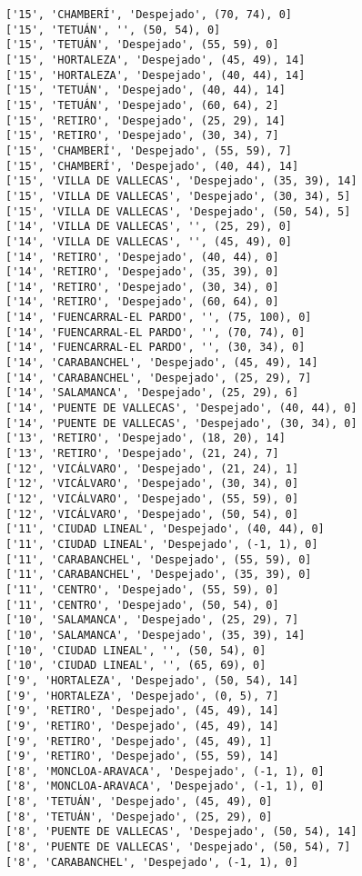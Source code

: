 \documentclass[11pt]{article}
\begin{document}
\begin{Verbatim}[commandchars=\\\{\}]
['15', 'CHAMBERÍ', 'Despejado', (70, 74), 0]
['15', 'TETUÁN', '', (50, 54), 0]
['15', 'TETUÁN', 'Despejado', (55, 59), 0]
['15', 'HORTALEZA', 'Despejado', (45, 49), 14]
['15', 'HORTALEZA', 'Despejado', (40, 44), 14]
['15', 'TETUÁN', 'Despejado', (40, 44), 14]
['15', 'TETUÁN', 'Despejado', (60, 64), 2]
['15', 'RETIRO', 'Despejado', (25, 29), 14]
['15', 'RETIRO', 'Despejado', (30, 34), 7]
['15', 'CHAMBERÍ', 'Despejado', (55, 59), 7]
['15', 'CHAMBERÍ', 'Despejado', (40, 44), 14]
['15', 'VILLA DE VALLECAS', 'Despejado', (35, 39), 14]
['15', 'VILLA DE VALLECAS', 'Despejado', (30, 34), 5]
['15', 'VILLA DE VALLECAS', 'Despejado', (50, 54), 5]
['14', 'VILLA DE VALLECAS', '', (25, 29), 0]
['14', 'VILLA DE VALLECAS', '', (45, 49), 0]
['14', 'RETIRO', 'Despejado', (40, 44), 0]
['14', 'RETIRO', 'Despejado', (35, 39), 0]
['14', 'RETIRO', 'Despejado', (30, 34), 0]
['14', 'RETIRO', 'Despejado', (60, 64), 0]
['14', 'FUENCARRAL-EL PARDO', '', (75, 100), 0]
['14', 'FUENCARRAL-EL PARDO', '', (70, 74), 0]
['14', 'FUENCARRAL-EL PARDO', '', (30, 34), 0]
['14', 'CARABANCHEL', 'Despejado', (45, 49), 14]
['14', 'CARABANCHEL', 'Despejado', (25, 29), 7]
['14', 'SALAMANCA', 'Despejado', (25, 29), 6]
['14', 'PUENTE DE VALLECAS', 'Despejado', (40, 44), 0]
['14', 'PUENTE DE VALLECAS', 'Despejado', (30, 34), 0]
['13', 'RETIRO', 'Despejado', (18, 20), 14]
['13', 'RETIRO', 'Despejado', (21, 24), 7]
['12', 'VICÁLVARO', 'Despejado', (21, 24), 1]
['12', 'VICÁLVARO', 'Despejado', (30, 34), 0]
['12', 'VICÁLVARO', 'Despejado', (55, 59), 0]
['12', 'VICÁLVARO', 'Despejado', (50, 54), 0]
['11', 'CIUDAD LINEAL', 'Despejado', (40, 44), 0]
['11', 'CIUDAD LINEAL', 'Despejado', (-1, 1), 0]
['11', 'CARABANCHEL', 'Despejado', (55, 59), 0]
['11', 'CARABANCHEL', 'Despejado', (35, 39), 0]
['11', 'CENTRO', 'Despejado', (55, 59), 0]
['11', 'CENTRO', 'Despejado', (50, 54), 0]
['10', 'SALAMANCA', 'Despejado', (25, 29), 7]
['10', 'SALAMANCA', 'Despejado', (35, 39), 14]
['10', 'CIUDAD LINEAL', '', (50, 54), 0]
['10', 'CIUDAD LINEAL', '', (65, 69), 0]
['9', 'HORTALEZA', 'Despejado', (50, 54), 14]
['9', 'HORTALEZA', 'Despejado', (0, 5), 7]
['9', 'RETIRO', 'Despejado', (45, 49), 14]
['9', 'RETIRO', 'Despejado', (45, 49), 14]
['9', 'RETIRO', 'Despejado', (45, 49), 1]
['9', 'RETIRO', 'Despejado', (55, 59), 14]
['8', 'MONCLOA-ARAVACA', 'Despejado', (-1, 1), 0]
['8', 'MONCLOA-ARAVACA', 'Despejado', (-1, 1), 0]
['8', 'TETUÁN', 'Despejado', (45, 49), 0]
['8', 'TETUÁN', 'Despejado', (25, 29), 0]
['8', 'PUENTE DE VALLECAS', 'Despejado', (50, 54), 14]
['8', 'PUENTE DE VALLECAS', 'Despejado', (50, 54), 7]
['8', 'CARABANCHEL', 'Despejado', (-1, 1), 0]

\end{Verbatim}
\end{document}
